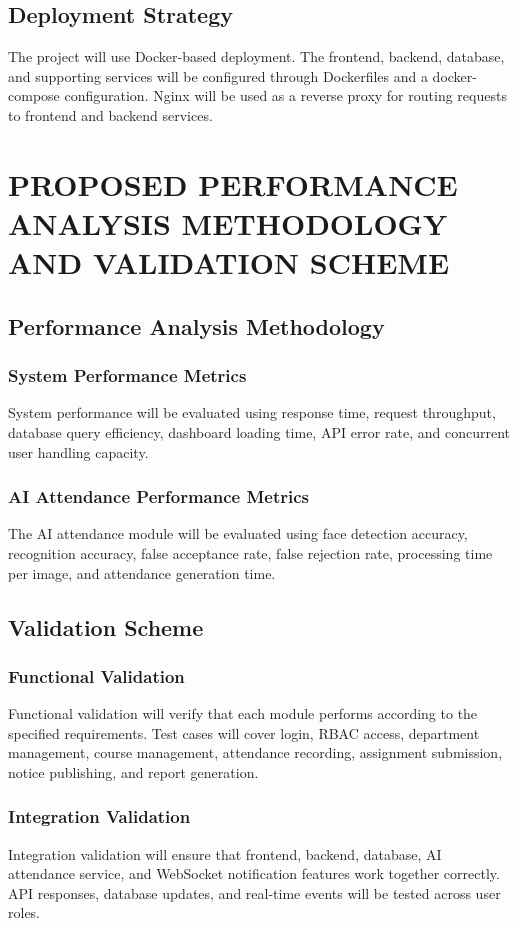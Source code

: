 \documentclass[12pt,a4paper,oneside]{report}
\let\oldsection\section
\renewcommand{\section}{\clearpage\oldsection}
\begin{document}
\section{Deployment Strategy}
The project will use Docker-based deployment. The frontend, backend, database, and supporting services will be configured through Dockerfiles and a docker-compose configuration. Nginx will be used as a reverse proxy for routing requests to frontend and backend services.

\chapter{PROPOSED PERFORMANCE ANALYSIS METHODOLOGY AND VALIDATION SCHEME}
\section{Performance Analysis Methodology}
\subsection{System Performance Metrics}
System performance will be evaluated using response time, request throughput, database query efficiency, dashboard loading time, API error rate, and concurrent user handling capacity.

\subsection{AI Attendance Performance Metrics}
The AI attendance module will be evaluated using face detection accuracy, recognition accuracy, false acceptance rate, false rejection rate, processing time per image, and attendance generation time.

\section{Validation Scheme}
\subsection{Functional Validation}
Functional validation will verify that each module performs according to the specified requirements. Test cases will cover login, RBAC access, department management, course management, attendance recording, assignment submission, notice publishing, and report generation.

\subsection{Integration Validation}
Integration validation will ensure that frontend, backend, database, AI attendance service, and WebSocket notification features work together correctly. API responses, database updates, and real-time events will be tested across user roles.
\end{document}
